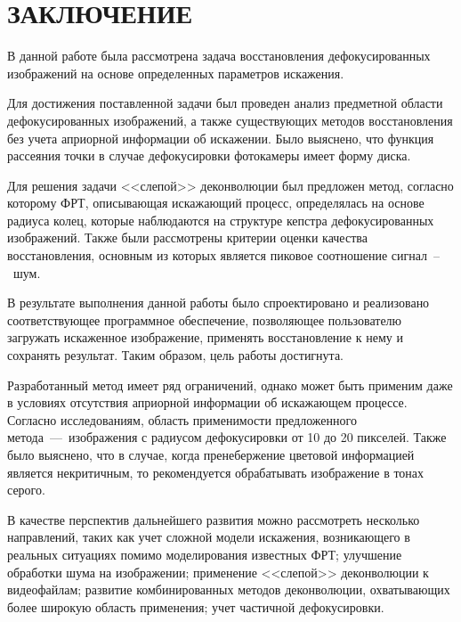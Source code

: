 \chapter*{ЗАКЛЮЧЕНИЕ}

В данной работе была рассмотрена задача восстановления дефокусированных изображений на основе определенных параметров искажения.

Для достижения поставленной задачи был проведен анализ предметной области дефокусированных изображений, а также существующих методов восстановления без учета априорной информации об искажении. Было выяснено, что функция рассеяния точки в случае дефокусировки фотокамеры имеет форму диска. 

Для решения задачи <<слепой>> деконволюции был предложен метод, согласно которому ФРТ, описывающая искажающий процесс, определялась на основе радиуса колец, которые наблюдаются на структуре кепстра дефокусированных изображений. Также были рассмотрены критерии оценки качества восстановления, основным из которых является пиковое соотношение сигнал~--~шум.

В результате выполнения данной работы было спроектировано и реализовано соответствующее программное обеспечение, позволяющее пользователю загружать искаженное изображение, применять восстановление к нему и сохранять результат. Таким образом, цель работы достигнута.

Разработанный метод имеет ряд ограничений, однако может быть применим даже в условиях отсутствия априорной информации об искажающем процессе. Согласно исследованиям, область применимости предложенного метода~---~изображения с радиусом дефокусировки от 10 до 20 пикселей. Также было выяснено, что в случае, когда пренебержение цветовой информацией является некритичным, то рекомендуется обрабатывать изображение в тонах серого. %

В качестве перспектив дальнейшего развития можно рассмотреть несколько направлений, таких как учет сложной модели искажения, возникающего в реальных ситуациях помимо моделирования известных ФРТ; улучшение обработки шума на изображении; применение <<слепой>> деконволюции к видеофайлам; развитие комбинированных методов деконволюции, охватывающих более широкую область применения; учет частичной дефокусировки.